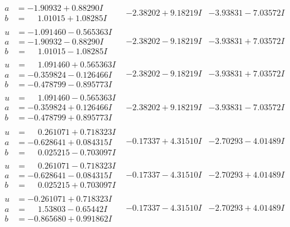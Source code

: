 \documentclass[1p]{elsarticle_modified}
\theoremstyle{definition}
\begin{document}
$$\begin{array}{c|c|c}
\begin{aligned}
a &= -1.90932 + 0.88290 I \\
b &= \phantom{-}1.01015 + 1.08285 I\end{aligned}
 & -2.38202 + 9.18219 I & -3.93831 - 7.03572 I \\ \hline\begin{aligned}
u &= -1.091460 - 0.565363 I \\
a &= -1.90932 - 0.88290 I \\
b &= \phantom{-}1.01015 - 1.08285 I\end{aligned}
 & -2.38202 - 9.18219 I & -3.93831 + 7.03572 I \\ \hline\begin{aligned}
u &= \phantom{-}1.091460 + 0.565363 I \\
a &= -0.359824 - 0.126466 I \\
b &= -0.478799 - 0.895773 I\end{aligned}
 & -2.38202 - 9.18219 I & -3.93831 + 7.03572 I \\ \hline\begin{aligned}
u &= \phantom{-}1.091460 - 0.565363 I \\
a &= -0.359824 + 0.126466 I \\
b &= -0.478799 + 0.895773 I\end{aligned}
 & -2.38202 + 9.18219 I & -3.93831 - 7.03572 I \\ \hline\begin{aligned}
u &= \phantom{-}0.261071 + 0.718323 I \\
a &= -0.628641 + 0.084315 I \\
b &= \phantom{-}0.025215 - 0.703097 I\end{aligned}
 & -0.17337 + 4.31510 I & -2.70293 - 4.01489 I \\ \hline\begin{aligned}
u &= \phantom{-}0.261071 - 0.718323 I \\
a &= -0.628641 - 0.084315 I \\
b &= \phantom{-}0.025215 + 0.703097 I\end{aligned}
 & -0.17337 - 4.31510 I & -2.70293 + 4.01489 I \\ \hline\begin{aligned}
u &= -0.261071 + 0.718323 I \\
a &= \phantom{-}1.53803 - 0.65442 I \\
b &= -0.865680 + 0.991862 I\end{aligned}
 & -0.17337 - 4.31510 I & -2.70293 + 4.01489 I \\ \hline\begin{aligned}

\end{aligned}
\end{array}$$
\end{document}
